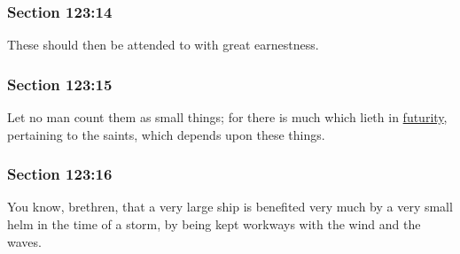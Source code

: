 	\subsubsection{Section 123:14} %
		\label{DC123-14}

		These should then be attended to with great earnestness.


	\subsubsection{Section 123:15} %
		\label{DC123-15}

		Let no man count them as small things; for there is much which lieth in \hyperref[FUTURITY]{futurity}, pertaining to the saints, which depends upon these things.


	\subsubsection{Section 123:16} %
		\label{DC123-16}

		You know, brethren, that a very large ship is benefited very much by a very small helm in the time of a storm, by being kept workways with the wind and the waves.


